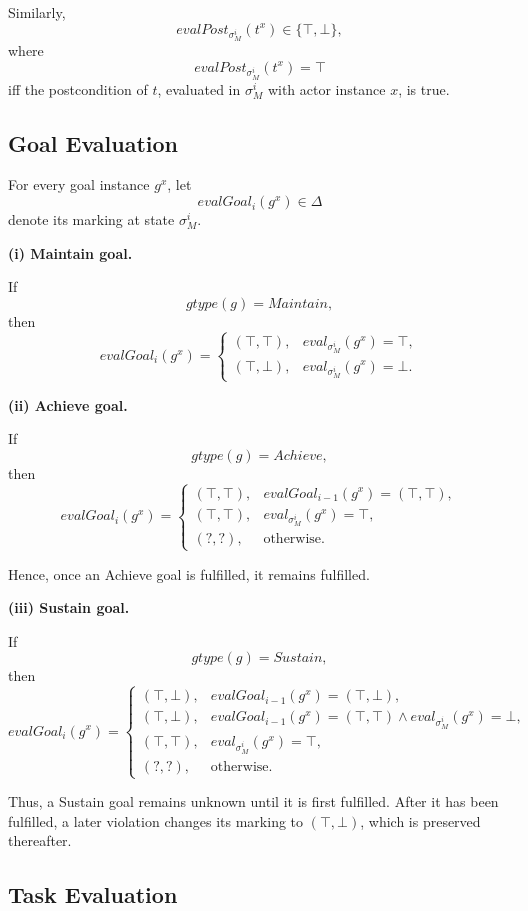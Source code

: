 \documentclass[11pt,a4paper]{article}
\newcommand{\gtype}{\mathit{gtype}}
\begin{document}
Similarly,
\[
evalPost_{\sigma_M^i}(t^x)
\in
\{\top,\bot\},
\]
where
\[
evalPost_{\sigma_M^i}(t^x)=\top
\]
iff the postcondition of \(t\), evaluated in
\(\sigma_M^i\) with actor instance \(x\), is true.


\subsection{Goal Evaluation}

For every goal instance \(g^x\), let
\[
evalGoal_i(g^x)\in\Delta
\]
denote its marking at state \(\sigma_M^i\).

\medskip
\noindent
\textbf{(i) Maintain goal.}

If
\[
\gtype(g)=\mathit{Maintain},
\]
then
\[
evalGoal_i(g^x)
=
\begin{cases}
(\top,\top),
&
eval_{\sigma_M^i}(g^x)=\top,
\\[1mm]
(\top,\bot),
&
eval_{\sigma_M^i}(g^x)=\bot.
\end{cases}
\]

\medskip
\noindent
\textbf{(ii) Achieve goal.}

If
\[
\gtype(g)=\mathit{Achieve},
\]
then
\[
evalGoal_i(g^x)
=
\begin{cases}
(\top,\top),
&
evalGoal_{i-1}(g^x)=(\top,\top),
\\[1mm]
(\top,\top),
&
eval_{\sigma_M^i}(g^x)=\top,
\\[1mm]
(?,?),
&
\text{otherwise}.
\end{cases}
\]

Hence, once an Achieve goal is fulfilled, it remains fulfilled.

\medskip
\noindent
\textbf{(iii) Sustain goal.}

If
\[
\gtype(g)=\mathit{Sustain},
\]
then
\[
evalGoal_i(g^x)
=
\begin{cases}
(\top,\bot),
&
evalGoal_{i-1}(g^x)=(\top,\bot),
\\[1mm]
(\top,\bot),
&
evalGoal_{i-1}(g^x)=(\top,\top)
\land
eval_{\sigma_M^i}(g^x)=\bot,
\\[1mm]
(\top,\top),
&
eval_{\sigma_M^i}(g^x)=\top,
\\[1mm]
(?,?),
&
\text{otherwise}.
\end{cases}
\]

Thus, a Sustain goal remains unknown until it is first fulfilled.
After it has been fulfilled, a later violation changes its marking to
\((\top,\bot)\), which is preserved thereafter.


\subsection{Task Evaluation}
\end{document}
